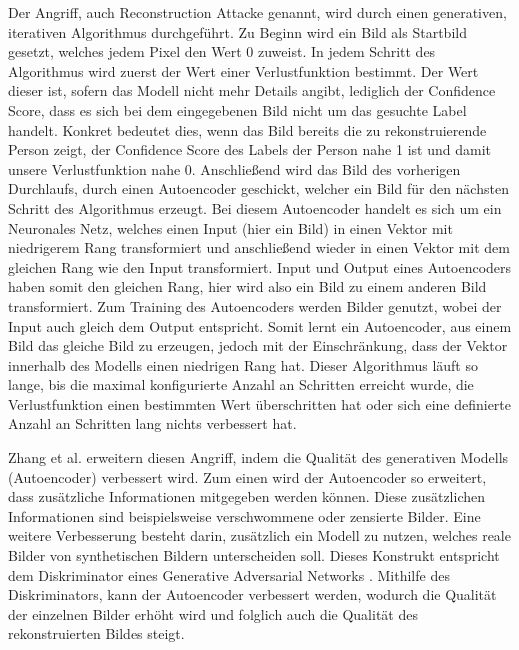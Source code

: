 Der Angriff, auch Reconstruction Attacke genannt, wird durch einen generativen, iterativen Algorithmus durchgeführt.
Zu Beginn wird ein Bild als Startbild gesetzt, welches jedem Pixel den Wert 0 zuweist.
In jedem Schritt des Algorithmus wird zuerst der Wert einer Verlustfunktion bestimmt.
Der Wert dieser ist, sofern das Modell nicht mehr Details angibt, lediglich der Confidence Score, dass es sich bei dem eingegebenen Bild nicht um das gesuchte Label handelt.
Konkret bedeutet dies, wenn das Bild bereits die zu rekonstruierende Person zeigt, der Confidence Score des Labels der Person nahe 1 ist und damit unsere Verlustfunktion nahe 0.
Anschließend wird das Bild des vorherigen Durchlaufs, durch einen Autoencoder geschickt, welcher ein Bild für den nächsten Schritt des Algorithmus erzeugt.
Bei diesem Autoencoder handelt es sich um ein Neuronales Netz, welches einen Input (hier ein Bild) in einen Vektor mit niedrigerem Rang transformiert und anschließend wieder in einen Vektor mit dem gleichen Rang wie den Input transformiert.
Input und Output eines Autoencoders haben somit den gleichen Rang, hier wird also ein Bild zu einem anderen Bild transformiert.
Zum Training des Autoencoders werden Bilder genutzt, wobei der Input auch gleich dem Output entspricht. 
Somit lernt ein Autoencoder, aus einem Bild das gleiche Bild zu erzeugen, jedoch mit der Einschränkung, dass der Vektor innerhalb des Modells einen niedrigen Rang hat.
Dieser Algorithmus läuft so lange, bis die maximal konfigurierte Anzahl an Schritten erreicht wurde, die Verlustfunktion einen bestimmten Wert überschritten hat oder sich eine definierte Anzahl an Schritten lang nichts verbessert hat.

Zhang et al. \cite{P-4} erweitern diesen Angriff, indem die Qualität des generativen Modells (Autoencoder) verbessert wird. 
Zum einen wird der Autoencoder so erweitert, dass zusätzliche Informationen mitgegeben werden können. 
Diese zusätzlichen Informationen sind beispielsweise verschwommene oder zensierte Bilder. 
Eine weitere Verbesserung besteht darin, zusätzlich ein Modell zu nutzen, welches reale Bilder von synthetischen Bildern unterscheiden soll.
Dieses Konstrukt entspricht dem Diskriminator eines Generative Adversarial Networks \cite{P-86}.
Mithilfe des Diskriminators, kann der Autoencoder verbessert werden, wodurch die Qualität der einzelnen Bilder erhöht wird und folglich auch die Qualität des rekonstruierten Bildes steigt.

